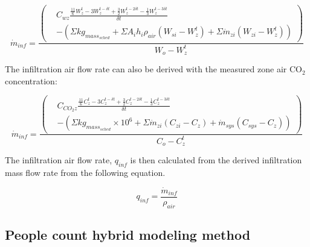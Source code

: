 \begin{equation}
\dot{m}_{inf} = \frac{\left(\begin{aligned}& C_{wz}\frac {\frac{11}{6}W_{z}^{t}-3W_{z}^{t-\delta t}+\frac{3}{2}W_{z}^{t-2\delta t}-\frac{1}{3}W_{z}^{t-3\delta t}} {\delta t}\\ & - \left(\Sigma{kg_{mass_{sched}}} + \Sigma{A_i h_i \rho_{air} (W_{si} - W_{z}^{t})} + \Sigma{\dot{m}_{zi} (W_{zi}-W_{z}^{t})}\right)\end{aligned}\right)} {W_o - W_{z}^{t}}
\end{equation}

The infiltration air flow rate can also be derived with the measured zone air CO$_2$ concentration:

\begin{equation}
\dot{m}_{inf} = \frac{\left(\begin{aligned}& C_{CO_{2}z}\frac {\frac{11}{6}C_{z}^{t}-3C_{z}^{t-\delta t}+\frac{3}{2}C_{z}^{t-2\delta t}-\frac{1}{3}C_{z}^{t-3\delta t}} {\delta t}\\ & - \left(\Sigma{kg_{mass_{sched}}}\times 10^{6} + \Sigma{\dot{m}_{zi}(C_{zi}-C_z)} + \dot{m}_{sys} (C_{sys} - C_z)\right)\end{aligned}\right)} {C_o - C_{z}^{t}}
\end{equation}


The infiltration air flow rate, $q_{inf}$ is then calculated from the derived infiltration mass flow rate from the following equation.

\begin{equation}
q_{inf}= \frac {\dot{m}_{inf}} {\rho_{air}}
\end{equation}



\subsection{People count hybrid modeling method}\label{People count hybrid modeling method}

